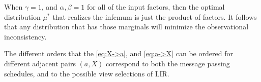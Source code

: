 \documentclass{article} %
\theoremstyle{plain}
\theoremstyle{definition}
\theoremstyle{remark}
\newcommand\sto{\usebox\stosbox}
\newcommand\mat[1]{\mathbf{#1}}
\newcommand\Msg{\dg{M\mskip-1mus\mskip-2mu g}}
\begin{document}
\begin{lproof} \label{proof:bp}
When $\gamma=1$, and $\alpha, \beta = 1$ for all of the input factors, then the optimal
distribution $\mu^*$ that realizes the infemum is just the product of factors. It follows that any distribution that has those marginals will minimize the observational inconsistency.

The different orders that the \eqref{eq:X->a}, and \eqref{eq:a->X} can be ordered
for different adjacent pairs $(a, X)$ correspond to both the message passing schedules, and to the possible view selections of LIR.
\end{lproof}
\end{document}
